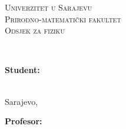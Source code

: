 \begin{titlepage}
	\begin{figure}[t]
		\centering
		\begin{minipage}{.6\textwidth}
			\centering
			\textsc{\large Univerzitet u Sarajevu}\\
			\textsc{\large Prirodno-matematički fakultet}\\
			\textsc{\large Odsjek za fiziku}
		\end{minipage}
	\end{figure}
	\vspace*{\fill}
	\begin{center}
		\textbf{\Large \MakeUppercase\@naslov}\\
		\vspace{2mm}
		\large \MakeUppercase\@podnaslov
	\end{center}
	\vspace*{\fill}
	\begin{figure}[b]
		\centering
		\begin{minipage}{.3\textwidth}
			\textbf{Student: \@student}\\
			\@indeks \\
		\end{minipage}
		\begin{minipage}{.35\textwidth}
			\begin{center}
				\vspace{25mm}
				Sarajevo, \@datum
			\end{center}
		\end{minipage}
		\begin{minipage}{.3\textwidth}
			\textbf{Profesor: \@profesor }\\
		\end{minipage}
	\end{figure}
\end{titlepage}